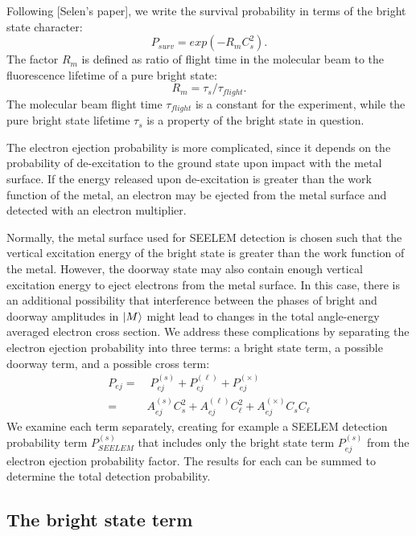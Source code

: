 \documentclass[12pt]{mitthesis}
\begin{document}
Following [Selen's paper], we write the survival probability in terms
of the bright state character:
\begin{equation}
  P_{surv} = exp \left( -R_m C_s^2 \right).
\end{equation}
The factor $R_m$ is defined as ratio of flight time in the molecular
beam to the fluorescence lifetime of a pure bright state:
\begin{equation}
R_m = \tau_s / \tau_{flight}.
\end{equation}
The molecular beam flight time $\tau_{flight}$ is a constant for the
experiment, while the pure bright state lifetime $\tau_s$ is a
property of the bright state in question.

The electron ejection probability is more complicated, since it
depends on the probability of de-excitation to the ground state upon
impact with the metal surface.  If the energy released upon
de-excitation is greater than the work function of the metal, an
electron may be ejected from the metal surface and detected with an
electron multiplier.

Normally, the metal surface used for SEELEM detection is chosen such
that the vertical excitation energy of the bright state is greater
than the work function of the metal. However, the doorway state may
also contain enough vertical excitation energy to eject electrons from
the metal surface. In this case, there is an additional possibility
that interference between the phases of bright and doorway amplitudes
in $\mathinner{|{M}\rangle}$ might lead to changes in the total angle-energy averaged
electron cross section. We address these complications by separating
the electron ejection probability into three terms: a bright state
term, a possible doorway term, and a possible cross term:
\begin{equation}
  \begin{split}
    P_{ej} =& \; P_{ej}^{(s)} + P_{ej}^{(\ell)} + P_{ej}^{(\times)}\\ 
    =& A_{ej}^{(s)} C_s^2 + A_{ej}^{(\ell)} C_\ell^2 + A_{ej}^{(\times)} C_s C_\ell
  \end{split}
\end{equation}
We examine each term separately, creating for example a SEELEM
detection probability term $P_{SEELEM}^{(s)}$ that includes only the
bright state term $P_{ej}^{(s)}$ from the electron ejection
probability factor.  The results for each can be summed to determine
the total detection probability.

\subsection{The bright state term}
\label{sec:bright-state-term}
\end{document}
